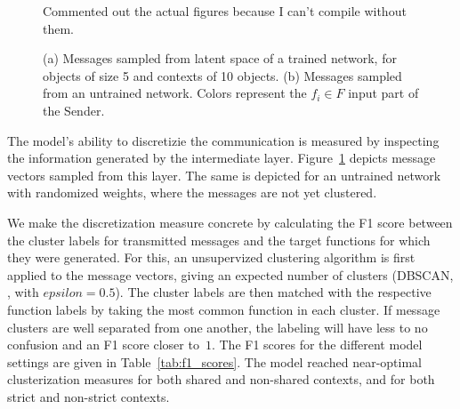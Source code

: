 \documentclass[11pt,a4paper]{article}
\begin{document}
\begin{figure}[ht]
  \centering
  Commented out the actual figures because I can't compile without them.
  \hspace{1cm}
  \caption{(a) Messages sampled from latent space of a trained network, for objects of size 5 and contexts of 10 objects. (b) Messages sampled from an untrained network. Colors represent the $f_i \in F$ input part of the Sender.}
 \label{fig:messages}
\end{figure}

The model's ability to discretizie the communication is measured by inspecting the information generated by the intermediate layer. Figure~\ref{fig:messages} depicts message vectors sampled from this layer. The same is depicted for an untrained network with randomized weights, where the messages are not yet clustered. 

We make the discretization measure concrete by calculating the F1 score between the cluster labels for transmitted messages and the target functions for which they were generated. For this, an unsupervized clustering algorithm is first applied to the message vectors, giving an expected number of clusters (DBSCAN, \citealp{ester_density-based_1996}, with $epsilon = 0.5$). The cluster labels are then matched with the respective function labels by taking the most common function in each cluster. If message clusters are well separated from one another, the labeling will have less to no confusion and an F1 score closer to~$1$. The F1 scores for the different model settings are given in Table~\ref{tab:f1_scores}. The model reached near-optimal clusterization measures for both shared and non-shared contexts, and for both strict and non-strict contexts. 
\end{document}
